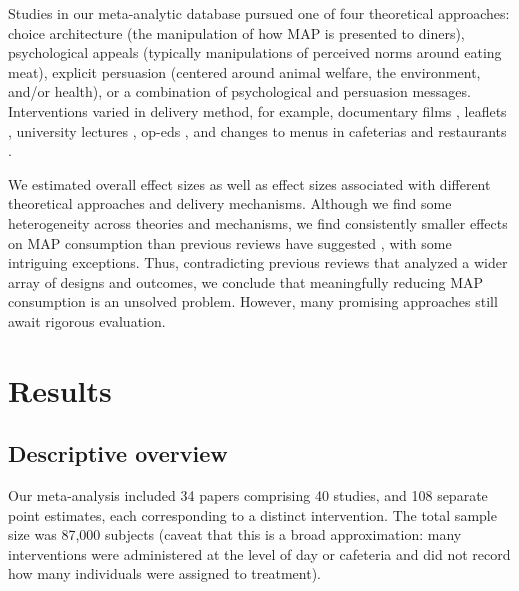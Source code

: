 \documentclass[sn-nature,referee,pdflatex]{sn-jnl}
\begin{document}
Studies in our meta-analytic database pursued one of four theoretical
approaches: choice architecture (the manipulation of how MAP is
presented to diners), psychological appeals (typically manipulations of
perceived norms around eating meat), explicit persuasion (centered
around animal welfare, the environment, and/or health), or a combination
of psychological and persuasion messages. Interventions varied in
delivery method, for example, documentary films
\citep{mathur2021effectiveness}, leaflets \citep{peacock2017},
university lectures \citep{jalil2023}, op-eds \citep{haile2021}, and
changes to menus in cafeterias \citep{andersson2021} and restaurants
\citep{coker2022, sparkman2021}.

\begin{comment}
Most interventions are brief and light-touch, e.g. reading a leaflet [@cooney2014] or watching a short video [@mathur2021effectiveness]. Venues with more than one publication from the dataset were \textit{Appetite}, \textit{Journal of Environmental Psychology}, and \textit{Nutrients}.
\end{comment}

We estimated overall effect sizes as well as effect sizes associated
with different theoretical approaches and delivery mechanisms. Although
we find some heterogeneity across theories and mechanisms, we find
consistently smaller effects on MAP consumption than previous reviews
have suggested
\citep{bianchi2018restructuring, byerly2018, chang2023, harguess2020, kwasny2022, mathur2021meta, meier2022, pandey2023},
with some intriguing exceptions. Thus, contradicting previous reviews
that analyzed a wider array of designs and outcomes, we conclude that
meaningfully reducing MAP consumption is an unsolved problem. However,
many promising approaches still await rigorous evaluation.

\section{Results}\label{sec2}

\subsection{Descriptive overview}\label{sec2.1}

Our meta-analysis included 34 papers comprising 40 studies, and 108
separate point estimates, each corresponding to a distinct intervention.
The total sample size was 87,000 subjects (caveat that this is a broad
approximation: many interventions were administered at the level of day
or cafeteria and did not record how many individuals were assigned to
treatment).
\end{document}
